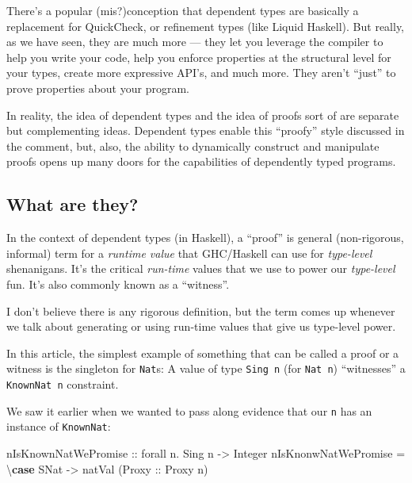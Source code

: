 \documentclass[]{article}
\newenvironment{Shaded}{}{}
\newcommand{\KeywordTok}[1]{\textcolor[rgb]{0.00,0.44,0.13}{\textbf{#1}}}
\newcommand{\DataTypeTok}[1]{\textcolor[rgb]{0.56,0.13,0.00}{#1}}
\newcommand{\OtherTok}[1]{\textcolor[rgb]{0.00,0.44,0.13}{#1}}
\newcommand{\FunctionTok}[1]{\textcolor[rgb]{0.02,0.16,0.49}{#1}}
\newcommand{\NormalTok}[1]{#1}
\begin{document}
There's a popular (mis?)conception that dependent types are basically a
replacement for QuickCheck, or refinement types (like Liquid Haskell). But
really, as we have seen, they are much more --- they let you leverage the
compiler to help you write your code, help you enforce properties at the
structural level for your types, create more expressive API's, and much more.
They aren't ``just'' to prove properties about your program.

In reality, the idea of dependent types and the idea of proofs sort of are
separate but complementing ideas. Dependent types enable this ``proofy'' style
discussed in the comment, but, also, the ability to dynamically construct and
manipulate proofs opens up many doors for the capabilities of dependently typed
programs.

\subsection{What are they?}\label{what-are-they}

In the context of dependent types (in Haskell), a ``proof'' is general
(non-rigorous, informal) term for a \emph{runtime value} that GHC/Haskell can
use for \emph{type-level} shenanigans. It's the critical \emph{run-time} values
that we use to power our \emph{type-level} fun. It's also commonly known as a
``witness''.

I don't believe there is any rigorous definition, but the term comes up whenever
we talk about generating or using run-time values that give us type-level power.

In this article, the simplest example of something that can be called a proof or
a witness is the singleton for \texttt{Nat}s: A value of type \texttt{Sing\ n}
(for \texttt{Nat\ n}) ``witnesses'' a \texttt{KnownNat\ n} constraint.

We saw it earlier when we wanted to pass along evidence that our \texttt{n} has
an instance of \texttt{KnownNat}:

\begin{Shaded}
\begin{Highlighting}[]
\OtherTok{nIsKnownNatWePromise ::}\NormalTok{ forall n}\FunctionTok{.} \DataTypeTok{Sing}\NormalTok{ n }\OtherTok{->} \DataTypeTok{Integer}
\NormalTok{nIsKnonwNatWePromise }\FunctionTok{=}\NormalTok{ \textbackslash{}}\KeywordTok{case}
    \DataTypeTok{SNat} \OtherTok{->}\NormalTok{ natVal (}\DataTypeTok{Proxy}\OtherTok{ ::} \DataTypeTok{Proxy}\NormalTok{ n)}
\end{Highlighting}
\end{Shaded}
\end{document}
